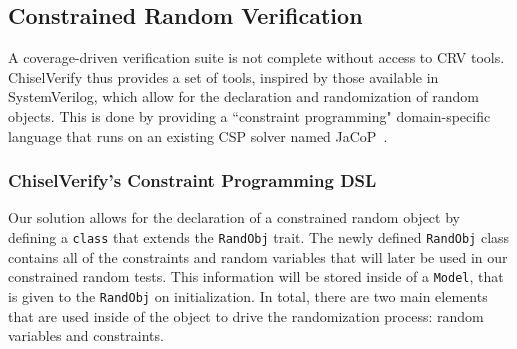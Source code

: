\documentclass[conference]{IEEEtran}
\begin{document}


\subsection{Constrained Random Verification}
A coverage-driven verification suite is not complete without access to CRV tools.
ChiselVerify thus provides a set of tools, inspired by those available in SystemVerilog, which allow for the declaration and randomization of random objects.
This is done by providing a ``constraint programming" domain-specific language that runs on an existing CSP solver named JaCoP~\cite{jacop2013}.

\subsubsection{ChiselVerify's Constraint Programming DSL}
Our solution allows for the declaration of a constrained random object by defining a \texttt{class} that extends the \texttt{RandObj} trait.
The newly defined \texttt{RandObj} class contains all of the constraints and random variables that will later be used in our constrained random tests. 
This information will be stored inside of a \texttt{Model}, that is given to the \texttt{RandObj} on initialization.
In total, there are two main elements that are used inside of the object to drive the randomization process: random variables and constraints.
\end{document}
